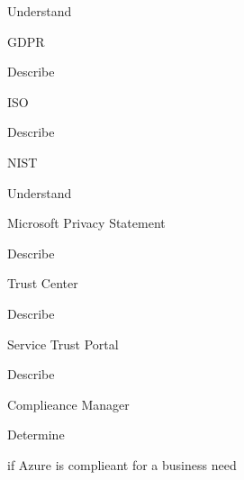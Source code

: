\documentclass{scrartcl}
\newenvironment{flashcard}[2][]{%
    #1
    \vfill
    \centerline{\Large{#2}}
    \vfill
\newpage
}
{\newpage}
\begin{document}
    \begin{flashcard}[Understand]{GDPR}

    \end{flashcard}

    \begin{flashcard}[Describe]{ISO}

    \end{flashcard}

    \begin{flashcard}[Describe]{NIST}

    \end{flashcard}

    \begin{flashcard}[Understand]{Microsoft Privacy Statement}

    \end{flashcard}

    \begin{flashcard}[Describe]{Trust Center}

    \end{flashcard}

    \begin{flashcard}[Describe]{Service Trust Portal}

    \end{flashcard}

    \begin{flashcard}[Describe]{Complieance Manager}

    \end{flashcard}

    \begin{flashcard}[Determine]{if Azure is complieant for a business need}

    \end{flashcard}
\end{document}
